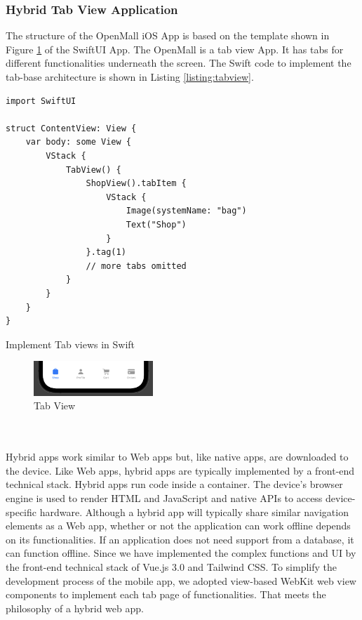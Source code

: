 \documentclass{article}
\begin{document}
\subsubsection{Hybrid Tab View Application}
The structure of the OpenMall iOS App is based on the template shown in Figure \ref{fig:tabview} of the SwiftUI App. The OpenMall is a tab view App. It has tabs for different functionalities underneath the screen. The Swift code to implement the tab-base architecture is shown in Listing \ref{listing:tabview}.

\begin{listing}[!htp]
\begin{verbatim}
import SwiftUI

struct ContentView: View {
    var body: some View {
        VStack {
            TabView() {
                ShopView().tabItem {
                    VStack {
                        Image(systemName: "bag")
                        Text("Shop")
                    }
                }.tag(1)
                // more tabs omitted
            }
        }
    }
}
\end{verbatim}
\caption{Implement Tab views in Swift}
\label{listing:tabview}
\end{listing}

\begin{figure}[!htp]
    \centering
    \includegraphics[width=0.4\textwidth]{tab.png}
    \caption{\label{fig:tabview}Tab View}
\end{figure}

\leavevmode
\\\\
Hybrid apps work similar to Web apps but, like native apps, are downloaded to the device. Like Web apps, hybrid apps are typically implemented by a front-end technical stack. Hybrid apps run code inside a container. The device's browser engine is used to render HTML and JavaScript and native APIs to access device-specific hardware. Although a hybrid app will typically share similar navigation elements as a Web app, whether or not the application can work offline depends on its functionalities. If an application does not need support from a database, it can function offline. Since we have implemented the complex functions and UI by the front-end technical stack of Vue.js 3.0 and Tailwind CSS. To simplify the development process of the mobile app,  we adopted view-based WebKit web view components to implement each tab page of functionalities. That meets the philosophy of a hybrid web app. 
\end{document}
